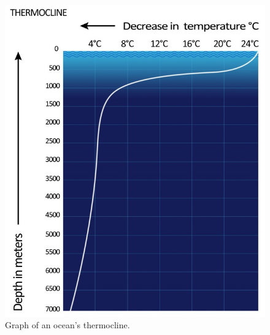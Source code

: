 \documentclass{article}
\begin{document}
\begin{figure}[H]
	\centering
	\includegraphics[scale=1]{./Images/BC1_Thermocline.jpg}
	\caption{Graph of an ocean's thermocline.}
\end{figure}
\end{document}
